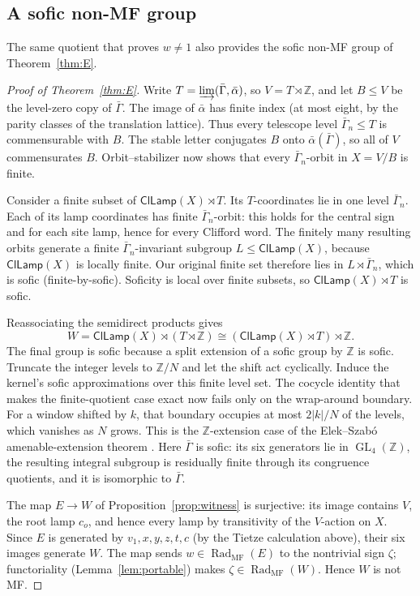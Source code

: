 \documentclass[11pt]{amsart}
\theoremstyle{definition}
\theoremstyle{remark}
\theoremstyle{plain}
\newcommand{\Z}{\mathbb Z}
\newcommand{\GL}{\operatorname{GL}}
\newcommand{\ClLamp}{\mathsf{ClLamp}}
\begin{document}
\subsection{A sofic non-MF group}

The same quotient that proves $w\ne1$ also provides the sofic non-MF group of
Theorem~\ref{thm:E}.


\begin{proof}[Proof of Theorem~\ref{thm:E}]
Write $T=\varinjlim(\bar\Gamma,\bar\alpha)$, so
$V=T\rtimes\mathbb Z$, and let $B\le V$ be the level-zero copy of
$\bar\Gamma$.  The image of $\bar\alpha$ has finite index (at most eight,
by the parity classes of the translation lattice).  Thus every telescope
level $\bar\Gamma_n\le T$ is commensurable with $B$.  The stable letter
conjugates $B$ onto $\bar\alpha(\bar\Gamma)$, so all of $V$ commensurates
$B$.  Orbit--stabilizer now shows that every $\bar\Gamma_n$-orbit in
$X=V/B$ is finite.

Consider a finite subset of $\ClLamp(X)\rtimes T$.  Its $T$-coordinates
lie in one level $\bar\Gamma_n$.  Each of its lamp coordinates has finite
$\bar\Gamma_n$-orbit: this holds for the central sign and for each site
lamp, hence for every Clifford word.  The finitely many resulting orbits
generate a finite $\bar\Gamma_n$-invariant subgroup $L\le\ClLamp(X)$,
because $\ClLamp(X)$ is locally finite.  Our original finite set therefore
lies in $L\rtimes\bar\Gamma_n$, which is sofic (finite-by-sofic).  Soficity
is local over finite subsets, so $\ClLamp(X)\rtimes T$ is sofic.

Reassociating the semidirect products gives
\[
 W=\ClLamp(X)\rtimes(T\rtimes\mathbb Z)
   \cong (\ClLamp(X)\rtimes T)\rtimes\mathbb Z.
\]
The final group is sofic because a split extension of a sofic group by
$\Z$ is sofic.  Truncate the integer levels to $\Z/N$ and let the
shift act cyclically.  Induce the kernel's sofic approximations over
this finite level set.  The cocycle identity that makes the
finite-quotient case exact now fails only on the wrap-around boundary.
For a window shifted by $k$, that boundary occupies at most $2|k|/N$
of the levels, which vanishes as $N$ grows.
This is the $\Z$-extension case of the Elek--Szab\'o amenable-extension
theorem \cite{ElekSzabo}.  Here
$\bar\Gamma$ is sofic: its six generators lie in $\GL_4(\mathbb Z)$,
the resulting integral subgroup is residually finite through its
congruence quotients, and it is isomorphic to $\bar\Gamma$.

The map $E\to W$ of Proposition~\ref{prop:witness} is surjective: its image
contains $V$, the root lamp $c_o$, and hence every lamp by transitivity of
the $V$-action on $X$.  Since $E$ is generated by
  $v_1,x,y,z,t,c$ (by the Tietze calculation above), their six
images generate $W$.  The map sends
$w\in\operatorname{Rad}_{\mathrm{MF}}(E)$ to the
nontrivial sign $\zeta$; functoriality (Lemma~\ref{lem:portable}) makes
$\zeta\in\operatorname{Rad}_{\mathrm{MF}}(W)$.  Hence $W$ is not MF.
\end{proof}
\end{document}
